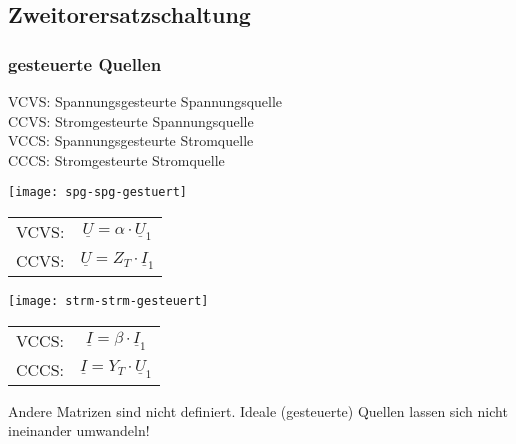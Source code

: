 \subsection{Zweitorersatzschaltung}
\subsubsection{gesteuerte Quellen}
\begin{mdframed}[style=exercise,frametitle=Ideal]
    \footnotesize
    VCVS: Spannungsgesteurte Spannungsquelle\\
    CCVS: Stromgesteurte Spannungsquelle\\
    VCCS: Spannungsgesteurte Stromquelle\\
    CCCS: Stromgesteurte Stromquelle
    \normalsize
    \begin{center}
        \texttt{[image: spg-spg-gestuert]}\\
    \begin{tabular}{l c}
       VCVS:& $\underline{U}=\alpha\cdot \underline{U}_1$\\
       CCVS:& $\underline{U}=Z_T\cdot \underline{I}_1$\\
    \end{tabular}
    \end{center}
    \begin{center}
        \texttt{[image: strm-strm-gesteuert]}\\
    \begin{tabular}{l c}
       VCCS:& $\underline{I}=\beta\cdot \underline{I}_1$\\
       CCCS:& $\underline{I}=Y_T\cdot \underline{U}_1$\\
    \end{tabular}
    \end{center}
    Andere Matrizen sind nicht definiert.  Ideale (gesteuerte) Quellen lassen
    sich nicht ineinander umwandeln!
\end{mdframed}

